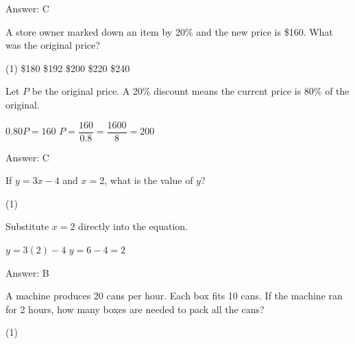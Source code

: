 \documentclass[11pt,paper=a4,answers]{exam}
\begin{document}
\begin{questions}
\begin{solution}
Answer: \colorbox{yellow!100}{C}
\end{solution}

\vspace{1cm}


\question
A store owner marked down an item by 20\% and the new price is \$160. What was the original price?

\begin{tasks}(1)
\task[A)] \$180 \task[B)] \$192 \task[C)] \$200 \task[D)] \$220 \task[E)] \$240
\end{tasks}

\begin{solution}
Let $P$ be the original price. A 20\% discount means the current price is 80\% of the original.
\vspace{5pt}
\begin{center}
$0.80P = 160$
\vspace{5pt}
$P = \dfrac{160}{0.8} = \dfrac{1600}{8} = 200$
\end{center}

Answer: \colorbox{yellow!100}{C}
\end{solution}

\vspace{1cm}

\question
If $y = 3x - 4$ and $x = 2$, what is the value of $y$?

\begin{tasks}(1)
    
\end{tasks}

\begin{solution}
Substitute $x = 2$ directly into the equation.
\vspace{5pt}
\begin{center}
$y = 3(2) - 4$
\vspace{5pt}
$y = 6 - 4 = 2$
\end{center}

Answer: \colorbox{yellow!100}{B}
\end{solution}

\vspace{1cm}

\question
A machine produces 20 cans per hour. Each box fits 10 cans. If the machine ran for 2 hours, how many boxes are needed to pack all the cans?

\begin{tasks}(1)
    
\end{tasks}


\end{questions}
\end{document}
